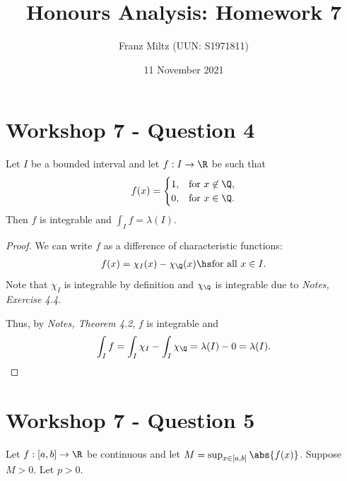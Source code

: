 \documentclass{article}
\begin{document}
\title{Honours Analysis: Homework 7}
\author{Franz Miltz (UUN: S1971811)}
\date{11 November 2021}
\maketitle

\section*{Workshop 7 - Question 4}

\begin{claim*}
	Let $I$ be a bounded interval and let $f:I\to\R$ be such that
	\begin{align*}
		f(x) = \begin{cases}
			       1, & \text{for }x\not\in\Q, \\
			       0, & \text{for }x\in\Q.
		       \end{cases}
	\end{align*}
	Then $f$ is integrable and $\int_I f = \lambda(I)$.
\end{claim*}
\begin{proof}
	We can write $f$ as a difference of characteristic functions:
	\begin{align*}
		f(x) = \chi_I(x) - \chi_\Q(x)\hs\text{for all }x\in I.
	\end{align*}
	Note that $\chi_I$ is integrable by definition and $\chi_\Q$ is integrable due to
	\emph{Notes, Exercise 4.4}.

	Thus, by \emph{Notes, Theorem 4.2}, $f$ is integrable and
	\begin{align*}
		\int_I f = \int_I \chi_I - \int_I \chi_\Q = \lambda(I)-0 = \lambda(I).
	\end{align*}
\end{proof}

\section*{Workshop 7 - Question 5}

Let $f:[a,b]\to\R$ be continuous and let $M=\sup_{x\in[a,b]}\abs{f(x)}$. Suppose
$M>0$. Let $p>0$.
\end{document}
